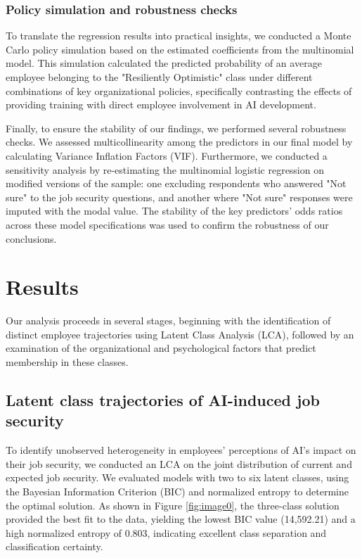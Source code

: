 \documentclass[]{article}
\begin{document}
\subsubsection{Policy simulation and robustness checks}
To translate the regression results into practical insights, we conducted a Monte Carlo policy simulation based on the estimated coefficients from the multinomial model. This simulation calculated the predicted probability of an average employee belonging to the "Resiliently Optimistic" class under different combinations of key organizational policies, specifically contrasting the effects of providing training with direct employee involvement in AI development.

Finally, to ensure the stability of our findings, we performed several robustness checks. We assessed multicollinearity among the predictors in our final model by calculating Variance Inflation Factors (VIF). Furthermore, we conducted a sensitivity analysis by re-estimating the multinomial logistic regression on modified versions of the sample: one excluding respondents who answered "Not sure" to the job security questions, and another where "Not sure" responses were imputed with the modal value. The stability of the key predictors' odds ratios across these model specifications was used to confirm the robustness of our conclusions.

\section{Results}
\label{sec:results}
Our analysis proceeds in several stages, beginning with the identification of distinct employee trajectories using Latent Class Analysis (LCA), followed by an examination of the organizational and psychological factors that predict membership in these classes.

\subsection{Latent class trajectories of AI-induced job security}
To identify unobserved heterogeneity in employees' perceptions of AI's impact on their job security, we conducted an LCA on the joint distribution of current and expected job security. We evaluated models with two to six latent classes, using the Bayesian Information Criterion (BIC) and normalized entropy to determine the optimal solution. As shown in Figure \ref{fig:image0}, the three-class solution provided the best fit to the data, yielding the lowest BIC value (14,592.21) and a high normalized entropy of 0.803, indicating excellent class separation and classification certainty.
\end{document}
